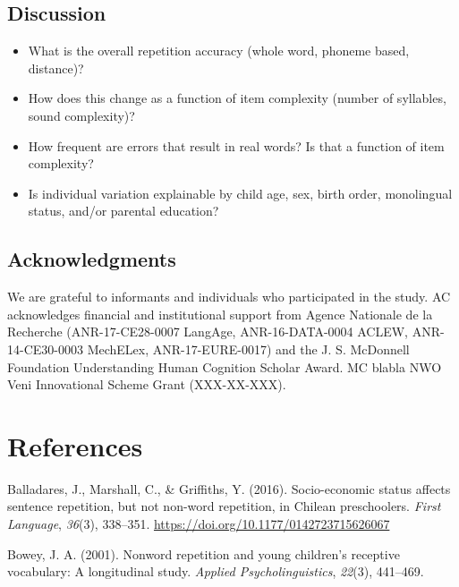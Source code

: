 \documentclass[english,,man]{apa6}
\providecommand{\tightlist}{%
  \setlength{\itemsep}{0pt}\setlength{\parskip}{0pt}}
\begin{document}
\hypertarget{discussion}{%
\subsection{Discussion}\label{discussion}}

\begin{itemize}
\tightlist
\item
  What is the overall repetition accuracy (whole word, phoneme based, distance)?
\item
  How does this change as a function of item complexity (number of syllables, sound complexity)?
\item
  How frequent are errors that result in real words? Is that a function of item complexity?
\item
  Is individual variation explainable by child age, sex, birth order, monolingual status, and/or parental education?
\end{itemize}

\newpage

\hypertarget{acknowledgments}{%
\subsection{Acknowledgments}\label{acknowledgments}}

We are grateful to informants and individuals who participated in the study. AC acknowledges financial and institutional support from Agence Nationale de la Recherche (ANR-17-CE28-0007 LangAge, ANR-16-DATA-0004 ACLEW, ANR-14-CE30-0003 MechELex, ANR-17-EURE-0017) and the J. S. McDonnell Foundation Understanding Human Cognition Scholar Award. MC blabla NWO Veni Innovational Scheme Grant (XXX-XX-XXX).

\hypertarget{references}{%
\section{References}\label{references}}

\setlength{\parindent}{-0.5in}
\setlength{\leftskip}{0.5in}

\hypertarget{refs}{}
\leavevmode\hypertarget{ref-balladares2016socio}{}%
Balladares, J., Marshall, C., \& Griffiths, Y. (2016). Socio-economic status affects sentence repetition, but not non-word repetition, in Chilean preschoolers. \emph{First Language}, \emph{36}(3), 338--351. \url{https://doi.org/10.1177/0142723715626067}

\leavevmode\hypertarget{ref-bowey2001nonword}{}%
Bowey, J. A. (2001). Nonword repetition and young children's receptive vocabulary: A longitudinal study. \emph{Applied Psycholinguistics}, \emph{22}(3), 441--469.
\end{document}
